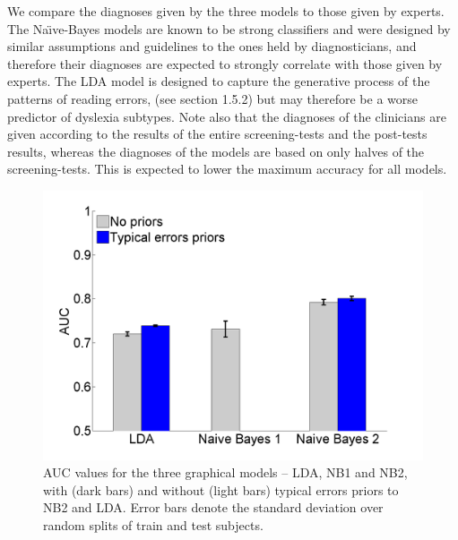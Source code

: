 {{We compare the diagnoses given by the three models to those given by experts. The Na\"{\i}ve-Bayes models are known to be strong classifiers and were designed by similar assumptions and guidelines to the ones held by diagnosticians, and therefore their diagnoses are expected to strongly correlate with those given by experts. The LDA model is designed to capture the generative process of the patterns of reading errors, (see section 1.5.2) but may therefore be a worse predictor of dyslexia subtypes. 
Note also that the diagnoses of the clinicians are given according to the results of the entire screening-tests and the post-tests results, whereas the diagnoses of the models are based on only halves of the screening-tests. This is expected to lower the maximum accuracy for all models.

\begin{figure}[H]
\vspace{.3in}
\includegraphics[width=\linewidth]{Figures/Ch1/AUC}
\caption{AUC values for the three graphical models – LDA, NB1 and NB2, with (dark bars) and without (light bars) typical errors priors to NB2 and LDA. Error bars denote the standard deviation over random splits of train and test subjects.}
\vspace{.3in}
\end{figure}

}}
